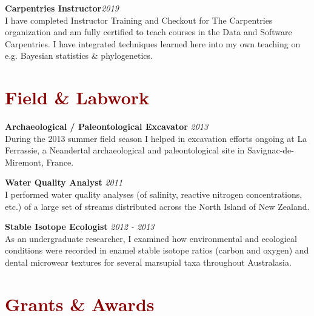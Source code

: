 \documentclass[11pt,margin,line]{resume}
\begin{document}
\begin{resume}
\textbf{Carpentries Instructor}\hfill \emph{2019}\\
I have completed Instructor Training and Checkout for The Carpentries organization and am fully certified to teach courses in the Data and Software Carpentries. I have integrated techniques learned here into my own teaching on e.g. Bayesian statistics \& phylogenetics.
\vspace{-1.5mm}

\section{\large\textcolor{DarkRed}{Field \& Labwork}}

\textbf{Archaeological / Paleontological Excavator} \hfill \emph{2013}\\
During the 2013 summer field season I helped in excavation efforts ongoing at La Ferrassie, a Neandertal archaeological and paleontological site in Savignac-de-Miremont, France.
\vspace{-1.5mm}

\textbf{Water Quality Analyst} \hfill \emph{2011}\\
I performed water quality analyses (of salinity, reactive nitrogen concentrations, etc.) of a large set of streams distributed across the North Island of New Zealand.
\vspace{-1.5mm}

\textbf{Stable Isotope Ecologist} \hfill \emph{2012 - 2013}\\
As an undergraduate researcher, I examined how environmental and ecological conditions were recorded in enamel stable isotope ratios (carbon and oxygen) and dental microwear textures for several marsupial taxa throughout Australasia.
\vspace{-1.5mm}

\section{\large\textcolor{DarkRed}{Grants \& Awards}}


\end{resume}
\end{document}
